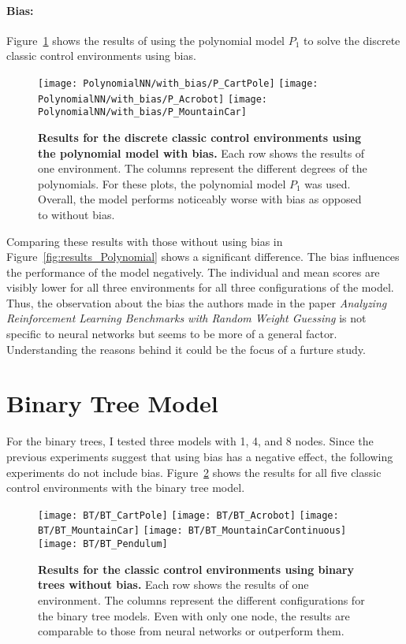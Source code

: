 \paragraph*{Bias:} Figure~\ref{fig:results_Polynomial_bias} shows the results of using the polynomial model $P_1$ to solve the discrete classic control environments using bias.
\begin{figure}[!ht]
  \centering
  \texttt{[image: PolynomialNN/with\_bias/P\_CartPole]}
  \texttt{[image: PolynomialNN/with\_bias/P\_Acrobot]}
  \texttt{[image: PolynomialNN/with\_bias/P\_MountainCar]}
\caption[Results for the discrete classic control environments using the polynomial model with bias]{
  \textbf{Results for the discrete classic control environments using the polynomial model with bias.}
   Each row shows the results of one environment. The columns represent the different degrees of the polynomials. For these plots, the polynomial model $P_1$ was used. Overall, the model performs noticeably worse with bias as opposed to without bias.
}
\label{fig:results_Polynomial_bias}
\end{figure}
Comparing these results with those without using bias in Figure~\ref{fig:results_Polynomial} shows a significant difference. The bias influences the performance of the model negatively. The individual and mean scores are visibly lower for all three environments for all three configurations of the model. Thus, the observation about the bias the authors made in the paper \emph{Analyzing Reinforcement Learning Benchmarks with Random Weight Guessing} is not specific to neural networks but seems to be more of a general factor. Understanding the reasons behind it could be the focus of a furture study.

\section{Binary Tree Model}
For the binary trees, I tested three models with 1, 4, and 8 nodes. Since the previous experiments suggest that using bias has a negative effect, the following experiments do not include bias. Figure~\ref{fig:results_BinaryTree} shows the results for all five classic control environments with the binary tree model.
\begin{figure}[!ht]
  \centering
  \texttt{[image: BT/BT\_CartPole]}
  \texttt{[image: BT/BT\_Acrobot]}
  \texttt{[image: BT/BT\_MountainCar]}
  \texttt{[image: BT/BT\_MountainCarContinuous]}
  \texttt{[image: BT/BT\_Pendulum]}
\caption[Results for the classic control environments using binary trees without bias]{
  \textbf{Results for the classic control environments using binary trees without bias.}
   Each row shows the results of one environment. The columns represent the different configurations for the binary tree models. Even with only one node, the results are comparable to those from neural networks or outperform them.
}
\label{fig:results_BinaryTree}
\end{figure}

